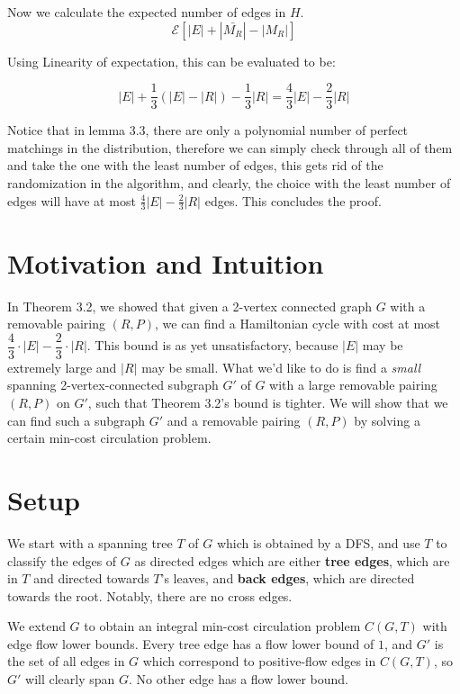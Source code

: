 \documentclass[12pt]{article}
\begin{document}
Now we calculate the expected number of edges in $H$.
\begin{equation}
\mathcal{E}[|E|+|\bar{M_R}|-|M_R|]
\end{equation}

Using Linearity of expectation, this can be evaluated to be:

\begin{equation}
|E| + \frac{1}{3}(|E|-|R|)-\frac{1}{3}|R| = \frac{4}{3}|E|-\frac{2}{3}|R|
\end{equation}

Notice that in lemma 3.3, there are only a polynomial number of perfect matchings in the distribution, therefore we can simply check through all of them and take the one with the least number of edges, this gets rid of the randomization in the algorithm, and clearly, the choice with the least number of edges will have at most $\frac{4}{3}|E|-\frac{2}{3}|R|$ edges. This concludes the proof.


\section{Motivation and Intuition}

In Theorem 3.2, we showed that given a 2-vertex connected graph $G$ with a
removable pairing $(R, P)$, we can find a Hamiltonian cycle with cost at most
$\dfrac{4}{3} \cdot |E| - \dfrac{2}{3} \cdot |R|$.  This bound is as yet
unsatisfactory, because $|E|$ may be extremely large and $|R|$ may be small.
What we'd like to do is find a \emph{small} spanning 2-vertex-connected
subgraph $G'$ of $G$ with a large removable pairing $(R, P)$ on $G'$, such that
Theorem 3.2's bound is tighter.  We will show that we can find such a subgraph
$G'$ and a removable pairing $(R,P)$ by solving a certain min-cost circulation
problem.

\section{Setup}

We start with a spanning tree $T$ of $G$ which is obtained by a DFS, and use
$T$ to classify the edges of $G$ as directed edges which are either {\bf tree
edges}, which are in $T$ and directed towards $T$'s leaves, and {\bf back
edges}, which are directed towards the root.  Notably, there are no cross edges.

We extend $G$ to obtain an integral min-cost circulation problem $C(G, T)$ with
edge flow lower bounds.  Every tree edge has a flow lower bound of $1$, and
$G'$ is the set of all edges in $G$ which correspond to positive-flow edges in
$C(G,T)$, so $G'$ will clearly span $G$.  No other edge has a flow lower bound.  
\end{document}
